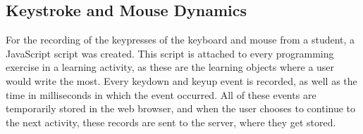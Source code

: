 \documentclass{acm_proc_article-sp}
\begin{document}

\subsection{Keystroke and Mouse Dynamics}

For the recording of the keypresses of the keyboard and mouse from a
student, a JavaScript script was created. This script is attached to
every programming exercise in a learning activity, as these are the
learning objects where a user would write the most. Every keydown and
keyup event is recorded, as well as the time in milliseconds in which the event
occurred. All of these events are temporarily stored in the web
browser, and when the user chooses to continue to the next activity,
these records are sent to the server, where they get stored.




\balancecolumns
\end{document}
